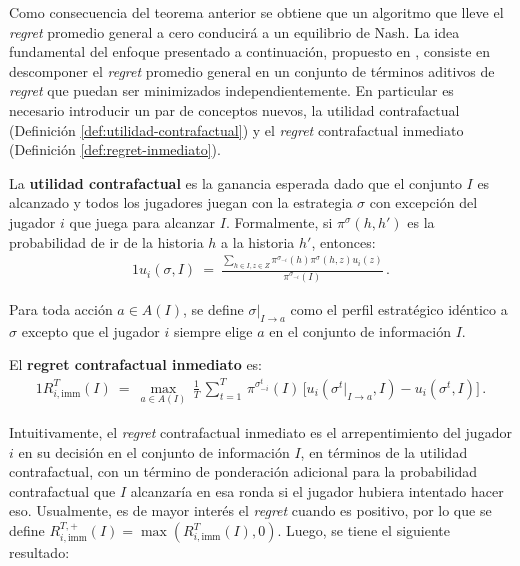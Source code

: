 Como consecuencia del teorema anterior se obtiene que un algoritmo que lleve el \mbox{\textit{regret}} promedio general a cero conducirá a un equilibrio de Nash. La idea fundamental del enfoque presentado a continuación, propuesto en \cite{bib:cfr}, consiste en descomponer el \textit{regret} promedio general en un conjunto de términos aditivos de \textit{regret} que puedan ser minimizados independientemente. En particular es necesario introducir un par de conceptos nuevos, la utilidad contrafactual (Definición \ref{def:utilidad-contrafactual}) y el \textit{regret} contrafactual inmediato (Definición \ref{def:regret-inmediato}).

\begin{definition}
\label{def:utilidad-contrafactual}
La \textbf{utilidad contrafactual} es la ganancia esperada dado que el conjunto $I$ es alcanzado y todos los jugadores juegan con la estrategia $\sigma$ con excepción del jugador $i$ que juega para alcanzar $I$. Formalmente, si $\pi^{\sigma}(h, h')$ es la probabilidad de ir de la historia $h$ a la historia $h'$, entonces:
\begin{alignat}{1}
u_i(\sigma, I)\ =\ \frac{\sum_{h \in I, z \in Z} \pi^{\sigma_{-i}}(h) \pi^{\sigma}(h, z) u_i(z)}{\pi^{\sigma_{-i}}(I)} \,.
\end{alignat}
\end{definition}

Para toda acción $a \in A(I)$, se define $\sigma|_{I \rightarrow a}$ como el perfil estratégico idéntico a $\sigma$ excepto que el jugador $i$ siempre elige $a$ en el conjunto de información $I$.

\begin{definition}
\label{def:regret-inmediato}
El \textbf{regret contrafactual inmediato} es:
\begin{alignat}{1}
R_{i, \text{imm}}^T(I)\ =\  \max_{a \in A(I)} \, \frac{1}{T} \, \sum_{t = 1}^T \, \pi^{\sigma_{-i}^t}(I) \, \bigl[ u_i(\sigma^t|_{I \rightarrow a}, I) - u_i(\sigma^t, I) \bigr]\,.
\end{alignat}
\end{definition}

Intuitivamente, el \textit{regret} contrafactual inmediato es el arrepentimiento del jugador $i$ en su decisión en el conjunto de información $I$, en términos de la utilidad contrafactual, con un término de ponderación adicional para la probabilidad contrafactual que $I$ alcanzaría en esa ronda si el jugador hubiera intentado hacer eso. Usualmente, es de mayor interés el \textit{regret} cuando es positivo, por lo que se define $R_{i, \text{imm}}^{T, +} (I) = \max(R^T_{i, \text{imm}} (I), 0)$. Luego, se tiene el siguiente resultado:

